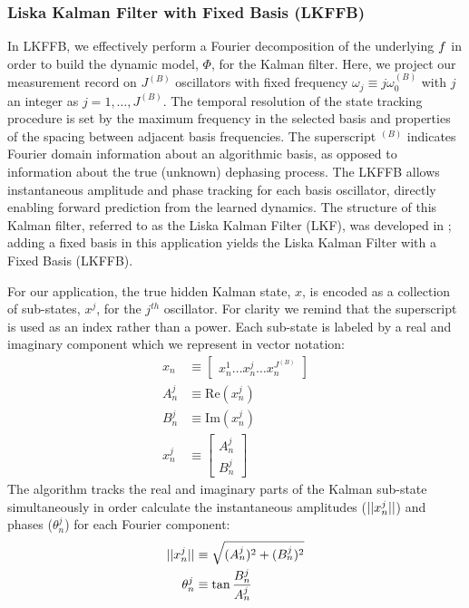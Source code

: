 \subsubsection{Liska Kalman Filter with Fixed Basis (LKFFB)}
In LKFFB, we effectively perform a Fourier decomposition of the underlying $f$ in order to build the dynamic model, $\Phi$, for the Kalman filter.   Here, we project our measurement record on $J^{(B)}$ oscillators with fixed frequency $\omega_{j}\equiv j\omega_0^{(B)}$ with $j$ an integer as $j = 1, \hdots, J^{(B)}$. The temporal resolution of the state tracking procedure is set by the maximum frequency in the selected basis and properties of the spacing between adjacent basis frequencies. The superscript $ ^{(B)}$ indicates Fourier domain information about an algorithmic basis, as opposed to information about the true (unknown) dephasing process.  The LKFFB allows instantaneous amplitude and phase tracking for each basis oscillator, directly enabling forward prediction from the learned dynamics.  The structure of this Kalman filter, referred to as the Liska Kalman Filter (LKF), was developed in \cite{livska2007}; adding a fixed basis in this application yields the Liska Kalman Filter with a Fixed Basis (LKFFB). 

For our application, the true hidden Kalman state, $x$, is encoded as a collection of sub-states, $x^j$, for the $j^{th}$ oscillator. For clarity we remind that the superscript is used as an index rather than a power.  Each sub-state is labeled by a real and imaginary component which we represent in vector notation: 
\begin{align}
	x_n & \equiv \begin{bmatrix} x^{1}_{n} \hdots x^{j}_{n} \hdots x^{J^{(B)}}_{n} \end{bmatrix} \\
	A^j_{n} & \equiv \textrm{Re}(x^{j}_{n}) \\
	B^j_{n} & \equiv \textrm{Im}(x^{j}_{n}) \\
	x^j_n & \equiv \begin{bmatrix} A^j_{n} \\ B^j_{n}  \end{bmatrix}
\end{align} 
The algorithm tracks the real and imaginary parts of the Kalman sub-state simultaneously in order calculate the instantaneous amplitudes ($||x^j_n||$) and phases ($\theta^{j}_{n}$)  for each Fourier component:
\begin{align}
	||x^j_n|| & \equiv \sqrt{(A^j_{n})^2 + (B^j_{n})^2} \\
	\theta^{j}_{n} & \equiv \tan{\frac{B^j_{n}}{A^j_{n}}}
\end{align}

